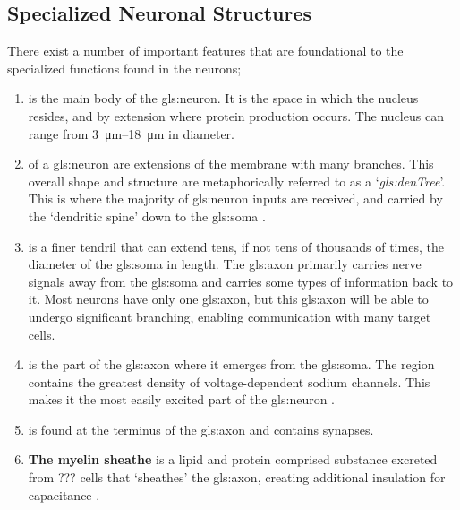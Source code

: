\documentclass[../../Orator]{subfiles}
\begin{document}
\subsection{Specialized Neuronal Structures}
There exist a number of important features that are foundational to the specialized functions found in the neurons;
\begin{enumerate}
    \item {} is the main body of the \gls{gls:neuron}. It is the space in which the nucleus resides, and by extension where protein production occurs. The nucleus can range from \qtyrange{3}{18}{\um} in diameter.
    \item {} of a \gls{gls:neuron} are extensions of the membrane with many branches. This overall shape and structure are metaphorically referred to as a `\textit{\gls{gls:denTree}}'\footnotemark. This is where the majority of \gls{gls:neuron} inputs are received, and carried by the `dendritic spine' down to the \gls{gls:soma} \cite{}. 
    \item {} is a finer tendril that can extend tens, if not tens of thousands of times, the diameter of the \gls{gls:soma} in length. The \gls{gls:axon} primarily carries nerve signals away from the \gls{gls:soma} and carries some types of information back to it. Most neurons have only one \gls{gls:axon}, but this \gls{gls:axon} will be able to undergo significant branching, enabling communication with many target cells. 
    \item {} is the part of the \gls{gls:axon} where it emerges from the \gls{gls:soma}. The region contains the greatest density of voltage-dependent sodium channels. This makes it the most easily excited part of the \gls{gls:neuron} \cite{}. 
    \item {} is found at the terminus of the \gls{gls:axon} and contains synapses. 
    \item \textbf{The myelin sheathe} is a lipid and protein comprised substance excreted from ??? cells that `sheathes' the \gls{gls:axon}, creating additional insulation for capacitance \cite{}.
\end{enumerate}
\end{document}
